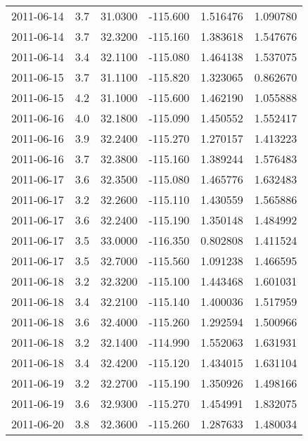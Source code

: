 \begin{tabular}{lrrrrr}
2011-06-14 &       3.7 &  31.0300 &  -115.600 &         1.516476 &         1.090780 \\
2011-06-14 &       3.7 &  32.3200 &  -115.160 &         1.383618 &         1.547676 \\
2011-06-14 &       3.4 &  32.1100 &  -115.080 &         1.464138 &         1.537075 \\
2011-06-15 &       3.7 &  31.1100 &  -115.820 &         1.323065 &         0.862670 \\
2011-06-15 &       4.2 &  31.1000 &  -115.600 &         1.462190 &         1.055888 \\
2011-06-16 &       4.0 &  32.1800 &  -115.090 &         1.450552 &         1.552417 \\
2011-06-16 &       3.9 &  32.2400 &  -115.270 &         1.270157 &         1.413223 \\
2011-06-16 &       3.7 &  32.3800 &  -115.160 &         1.389244 &         1.576483 \\
2011-06-17 &       3.6 &  32.3500 &  -115.080 &         1.465776 &         1.632483 \\
2011-06-17 &       3.2 &  32.2600 &  -115.110 &         1.430559 &         1.565886 \\
2011-06-17 &       3.6 &  32.2400 &  -115.190 &         1.350148 &         1.484992 \\
2011-06-17 &       3.5 &  33.0000 &  -116.350 &         0.802808 &         1.411524 \\
2011-06-17 &       3.5 &  32.7000 &  -115.560 &         1.091238 &         1.466595 \\
2011-06-18 &       3.2 &  32.3200 &  -115.100 &         1.443468 &         1.601031 \\
2011-06-18 &       3.4 &  32.2100 &  -115.140 &         1.400036 &         1.517959 \\
2011-06-18 &       3.6 &  32.4000 &  -115.260 &         1.292594 &         1.500966 \\
2011-06-18 &       3.2 &  32.1400 &  -114.990 &         1.552063 &         1.631931 \\
2011-06-18 &       3.4 &  32.4200 &  -115.120 &         1.434015 &         1.631104 \\
2011-06-19 &       3.2 &  32.2700 &  -115.190 &         1.350926 &         1.498166 \\
2011-06-19 &       3.6 &  32.9300 &  -115.270 &         1.454991 &         1.832075 \\
2011-06-20 &       3.8 &  32.3600 &  -115.260 &         1.287633 &         1.480034 \\

\end{tabular}
